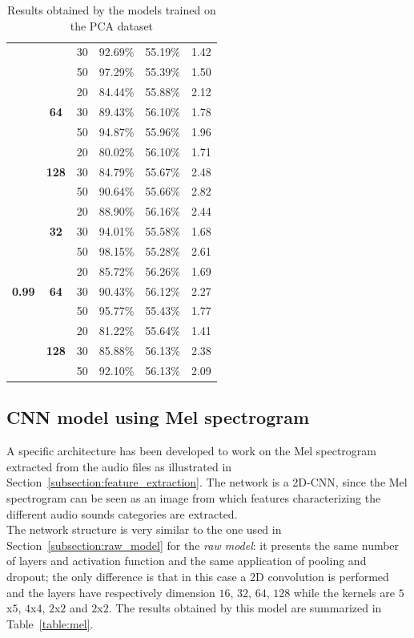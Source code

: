 \documentclass[oneside,openany]{article}
\begin{document}
\begin{table}[!ht]
{\begin{tabular}{|c|c|c|c|c|c|}
        & & 30 & 92.69\% & 55.19\% & 1.42 \\ 
        & & 50 & 97.29\% & 55.39\% & 1.50 \\ 
        \cline{2-6}
        & \multirow{3}{4em}{\centering \textbf{64}} & 20 & 84.44\% & 55.88\% & 2.12 \\ 
        & & 30 & 89.43\% & 56.10\% & 1.78 \\ 
        & & 50 & 94.87\% & 55.96\% & 1.96 \\ 
        \cline{2-6}
        & \multirow{3}{4em}{\centering \textbf{128}} & 20 & 80.02\% & 56.10\% & 1.71 \\ 
        & & 30 & 84.79\% & 55.67\% & 2.48 \\ 
        & & 50 & 90.64\% & 55.66\% & 2.82 \\ 
        \hline
        \multirow{9}{4em}{\centering \textbf{0.99}} & \multirow{3}{4em}{\centering \textbf{32}} & 20 & 88.90\% & 56.16\% & 2.44 \\ 
        & & 30 & 94.01\% & 55.58\% & 1.68 \\ 
        & & 50 & 98.15\% & 55.28\% & 2.61 \\ 
        \cline{2-6}
        & \multirow{3}{4em}{\centering \textbf{64}} & 20 & 85.72\% & 56.26\% & 1.69 \\ 
        & & 30 & 90.43\% & 56.12\% & 2.27 \\ 
        & & 50 & 95.77\% & 55.43\% & 1.77 \\ 
        \cline{2-6}
        & \multirow{3}{4em}{\centering \textbf{128}} & 20 & 81.22\% & 55.64\% & 1.41\\ 
        & & 30 & 85.88\% & 56.13\% & 2.38 \\ 
        & & 50 & 92.10\% & 56.13\% & 2.09 \\ 
        \hline
    \end{tabular}
    }
    \caption{Results obtained by the models trained on the PCA dataset}
    \label{table:pca}
    \end{table}
    
    \subsection{CNN model using Mel spectrogram}
    \label{subsection:mel_model}
    A specific architecture has been developed to work on the Mel spectrogram extracted from the audio files as illustrated in Section~\ref{subsection:feature_extraction}. The network is a 2D-CNN, since the Mel spectrogram can be seen as an image from which features characterizing the different audio sounds categories are extracted.\\
    The network structure is very similar to the one used in Section~\ref{subsection:raw_model} for the \textit{raw model}: it presents the same number of layers and activation function and the same application of pooling and dropout; the only difference is that in this case a 2D convolution is performed and the layers have respectively dimension $16$, $32$, $64$, $128$ while the kernels are $5$x$5$, $4$x$4$, $2$x$2$ and $2$x$2$.
    The results obtained by this model are summarized in Table~\ref{table:mel}.
    
\end{document}

